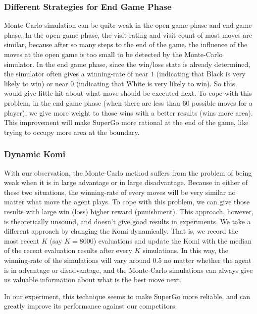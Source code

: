 \subsubsection{Different Strategies for End Game Phase}
Monte-Carlo simulation can be quite weak in the open game phase and end game phase. In the open game phase, the visit-rating and visit-count of most moves are similar, because after so many steps to the end of the game, the influence of the moves at the open game is too small to be detected by the Monte-Carlo simulator. In the end game phase, since the win/loss state is already determined, the simulator often gives a winning-rate of near $1$ (indicating that Black is very likely to win) or near $0$ (indicating that White is very likely to win). So this would give little hit about what move should be executed next. To cope with this problem, in the end game phase (when there are less than $60$ possible moves for a player), we give more weight to those wins with a better results (wins more area). This improvement will make SuperGo more rational at the end of the game, like trying to occupy more area at the boundary.

\subsubsection{Dynamic Komi}
With our observation, the Monte-Carlo method suffers from the problem of being weak when it is in large advantage or in large disadvantage. Because in either of these two situations, the winning-rate of every moves will be very similar no matter what move the agent plays. To cope with this problem, we can give those results with large win (loss) higher reward (punishment). This approach, however, is theoretically unsound, and doesn't give good results in experiments. We take a different approach by changing the Komi dynamically. That is, we record the most recent $K$ (say $K=8000$) evaluations and update the Komi with the median of the recent evaluation results after every $K$ simulations. In this way, the winning-rate of the simulations will vary around $0.5$ no matter whether the agent is in advantage or disadvantage, and the Monte-Carlo simulations can always give us valuable information about what is the best move next.

In our experiment, this technique seems to make SuperGo more reliable, and can greatly improve its performance against our competitors.





